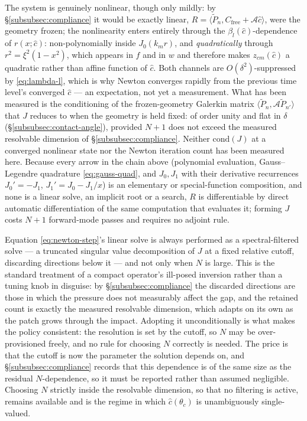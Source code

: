 The system is genuinely nonlinear, though only mildly: by \S\ref{subsubsec:compliance} it would be exactly linear, $R=\langle\tilde P_n,C_{\text{free}}+\mathcal A\hat c\rangle$, were the geometry frozen; the nonlinearity enters entirely through the $\beta_l(\hat c)$-dependence of $r(x;\hat c)$: non-polynomially inside $J_0(k_mr)$, and \emph{quadratically} through $r^2=\xi^2(1-x^2)$, which appears in $f$ and in $w$ and therefore makes $z_{cm}(\hat c)$ a quadratic rather than affine function of $\hat c$. Both channels are $O(\delta^2)$-suppressed by \eqref{eq:lambda-l}, which is why Newton converges rapidly from the previous time level's converged $\hat c$ --- an expectation, not yet a measurement. What has been measured is the conditioning of the frozen-geometry Galerkin matrix $\langle\tilde P_n,\mathcal A\tilde P_{n'}\rangle$ that $J$ reduces to when the geometry is held fixed: of order unity and flat in $\delta$ (\S\ref{subsubsec:contact-angle}), provided $N+1$ does not exceed the measured resolvable dimension of \S\ref{subsubsec:compliance}. Neither $\mathrm{cond}(J)$ at a converged nonlinear state nor the Newton iteration count has been measured here. Because every arrow in the chain above (polynomial evaluation, Gauss--Legendre quadrature \eqref{eq:gauss-quad}, and $J_0,J_1$ with their derivative recurrences $J_0'=-J_1$, $J_1'=J_0-J_1/x$) is an elementary or special-function composition, and none is a linear solve, an implicit root or a search, $R$ is differentiable by direct automatic differentiation of the same computation that evaluates it; forming $J$ costs $N+1$ forward-mode passes and requires no adjoint rule.

Equation \eqref{eq:newton-step}'s linear solve is always performed as a spectral-filtered solve --- a truncated singular value decomposition of $J$ at a fixed relative cutoff, discarding directions below it --- and not only when $N$ is large. This is the standard treatment of a compact operator's ill-posed inversion rather than a tuning knob in disguise: by \S\ref{subsubsec:compliance} the discarded directions are those in which the pressure does not measurably affect the gap, and the retained count is exactly the measured resolvable dimension, which adapts on its own as the patch grows through the impact. Adopting it unconditionally is what makes the policy consistent: the resolution is set by the cutoff, so $N$ may be over-provisioned freely, and no rule for choosing $N$ correctly is needed. The price is that the cutoff is now the parameter the solution depends on, and \S\ref{subsubsec:compliance} records that this dependence is of the same size as the residual $N$-dependence, so it must be reported rather than assumed negligible. Choosing $N$ strictly inside the resolvable dimension, so that no filtering is active, remains available and is the regime in which $\hat c(\theta_c)$ is unambiguously single-valued.

